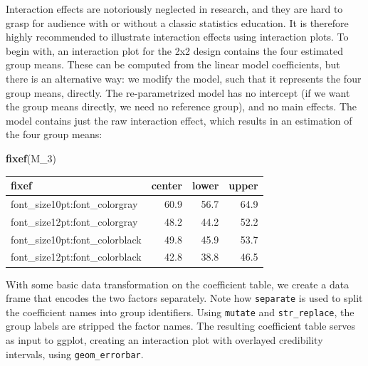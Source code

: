 \documentclass[]{svmono}
\newenvironment{Shaded}{\begin{snugshade}}{\end{snugshade}}
\newcommand{\KeywordTok}[1]{\textcolor[rgb]{0.13,0.29,0.53}{\textbf{#1}}}
\newcommand{\DataTypeTok}[1]{\textcolor[rgb]{0.13,0.29,0.53}{#1}}
\newcommand{\DecValTok}[1]{\textcolor[rgb]{0.00,0.00,0.81}{#1}}
\newcommand{\StringTok}[1]{\textcolor[rgb]{0.31,0.60,0.02}{#1}}
\newcommand{\OperatorTok}[1]{\textcolor[rgb]{0.81,0.36,0.00}{\textbf{#1}}}
\newcommand{\NormalTok}[1]{#1}
\theoremstyle{definition}
\theoremstyle{definition}
\theoremstyle{definition}
\theoremstyle{remark}
\begin{document}
Interaction effects are notoriously neglected in research, and they are
hard to grasp for audience with or without a classic statistics
education. It is therefore highly recommended to illustrate interaction
effects using interaction plots. To begin with, an interaction plot for
the 2x2 design contains the four estimated group means. These can be
computed from the linear model coefficients, but there is an alternative
way: we modify the model, such that it represents the four group means,
directly. The re-parametrized model has no intercept (if we want the
group means directly, we need no reference group), and no main effects.
The model contains just the raw interaction effect, which results in an
estimation of the four group means:

\begin{Shaded}
\end{Shaded}

\begin{Shaded}
\begin{Highlighting}[]
\KeywordTok{fixef}\NormalTok{(M_}\DecValTok{3}\NormalTok{)}
\end{Highlighting}
\end{Shaded}

\begin{longtable}[]{@{}lrrr@{}}
\toprule
fixef & center & lower & upper\tabularnewline
\midrule
\endhead
font\_size10pt:font\_colorgray & 60.9 & 56.7 & 64.9\tabularnewline
font\_size12pt:font\_colorgray & 48.2 & 44.2 & 52.2\tabularnewline
font\_size10pt:font\_colorblack & 49.8 & 45.9 & 53.7\tabularnewline
font\_size12pt:font\_colorblack & 42.8 & 38.8 & 46.5\tabularnewline
\bottomrule
\end{longtable}

With some basic data transformation on the coefficient table, we create
a data frame that encodes the two factors separately. Note how
\texttt{separate} is used to split the coefficient names into group
identifiers. Using \texttt{mutate} and \texttt{str\_replace}, the group
labels are stripped the factor names. The resulting coefficient table
serves as input to ggplot, creating an interaction plot with overlayed
credibility intervals, using \texttt{geom\_errorbar}.
\end{document}
